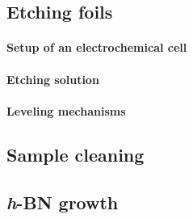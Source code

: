\subsection{Etching foils}
\label{sec:etching}


	\paragraph{Setup of an electrochemical cell}
	\paragraph{Etching solution}
	\paragraph{Leveling mechanisms}

\subsection{Sample cleaning}
\subsection{\textit{h}-BN growth}

